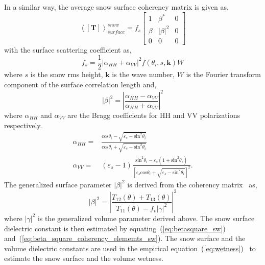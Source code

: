 In a similar way, the average snow surface coherency matrix is given as,
\begin{equation}
\left\langle\mathbf{[T]}\right\rangle_{surface}^{snow} = f_{s}\left[ \begin{array}{ccc}
1 & \beta^* & 0 \\
\beta & |\beta|^{2} & 0 \\
0 & 0 & 0
\end{array}\right] 
\label{eq:surface_coherency_matrix_sw}
\end{equation}
with the surface scattering coefficient as,
\begin{equation}
f_s=\frac{1}{2}|\alpha_{HH} + \alpha_{VV}|^2f(\theta_{i},s,\bm{k})W
\label{eq:fs_sw}
\end{equation}
where $s$ is the snow rms height, $\bm{k}$ is the wave number, $W$ is the Fourier transform component of the surface correlation length and,
\begin{equation}
|\beta|^2 = \left|\frac{\alpha_{HH}-\alpha_{VV}}{\alpha_{HH}+\alpha_{VV}}\right|^2
\label{eq:betasquare_sw}
\end{equation}
where $\alpha_{HH}$ and $\alpha_{VV}$ are the Bragg coefficients for HH and VV polarizations respectively.  
\begin{subequations}
	\begin{align}
	\alpha_{HH} =& \frac{\mbox{cos}\theta_{i} - \sqrt{\varepsilon_{s} - \mbox{sin}^2\theta_{i}}}{\mbox{cos}\theta_{i} + \sqrt{\varepsilon_{s} - \mbox{sin}^2\theta_{i}}} \\
	\alpha_{VV} =& (\varepsilon_{s}-1)\frac{\mbox{sin}^2\theta_{i} - \varepsilon_{s}(1 + \mbox{sin}^2\theta_{i})}{\left[\varepsilon_{s}\mbox{cos}\theta_{i} + \sqrt{\varepsilon_{s} - \mbox{sin}^2\theta_{i}}\right]^2}.
	\end{align}
	\label{eq:fresnel_refl_coefficients_sw}
\end{subequations}
The generalized surface parameter $|\beta|^2$ is derived from the coherency matrix~\citep{singh2013b} as,
\begin{equation}
|\beta|^2 = \left|\frac{T_{12}(\theta) + T_{13}(\theta)}{T_{11}(\theta) - f_{v}|\gamma|^2}\right|^2
\label{eq:beta_square_coherency_elememts_sw}
\end{equation}
where $|\gamma|^2$ is the generalized volume parameter derived above.
The snow surface dielectric constant is then estimated by equating~(\ref{eq:betasquare_sw}) and~(\ref{eq:beta_square_coherency_elememts_sw}). The snow surface and the volume dielectric constants are used in the empirical equation~(\ref{eq:wetness})~\citep{denoth1995electron} to estimate the snow surface and the volume wetness. 
